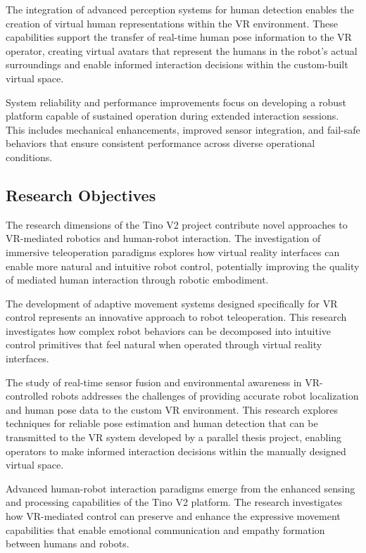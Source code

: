The integration of advanced perception systems for human detection enables the creation of virtual human representations within the VR environment. These capabilities support the transfer of real-time human pose information to the VR operator, creating virtual avatars that represent the humans in the robot's actual surroundings and enable informed interaction decisions within the custom-built virtual space.

System reliability and performance improvements focus on developing a robust platform capable of sustained operation during extended interaction sessions. This includes mechanical enhancements, improved sensor integration, and fail-safe behaviors that ensure consistent performance across diverse operational conditions.

\subsection{Research Objectives}
The research dimensions of the Tino V2 project contribute novel approaches to VR-mediated robotics and human-robot interaction. The investigation of immersive teleoperation paradigms explores how virtual reality interfaces can enable more natural and intuitive robot control, potentially improving the quality of mediated human interaction through robotic embodiment.

The development of adaptive movement systems designed specifically for VR control represents an innovative approach to robot teleoperation. This research investigates how complex robot behaviors can be decomposed into intuitive control primitives that feel natural when operated through virtual reality interfaces.

The study of real-time sensor fusion and environmental awareness in VR-controlled robots addresses the challenges of providing accurate robot localization and human pose data to the custom VR environment. This research explores techniques for reliable pose estimation and human detection that can be transmitted to the VR system developed by a parallel thesis project, enabling operators to make informed interaction decisions within the manually designed virtual space.

Advanced human-robot interaction paradigms emerge from the enhanced sensing and processing capabilities of the Tino V2 platform. The research investigates how VR-mediated control can preserve and enhance the expressive movement capabilities that enable emotional communication and empathy formation between humans and robots.

